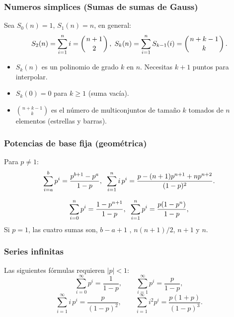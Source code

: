


\subsubsection{Numeros simplices (Sumas de sumas de Gauss)} Sea $S_0(n)=1$, $S_1(n) = n$, en general:
\[
S_2(n)
=\sum_{i=1}^n i= \binom{n+1}{2}
, \hspace{1mm}
S_k(n)
=\sum_{i=1}^n S_{k-1}(i) 
= \binom{n+k-1}{k}.
\]
\begin{extended}[]
\begin{itemize}
    \item $S_k(n)$ es un polinomio de grado $k$ en $n$. Necesitas $k+1$ puntos para interpolar.
    \item $S_k(0) = 0$ para $k\ge1$ (suma vacía).
    \item $\binom{n+k-1}{k}$ es el número de multiconjuntos de tamaño $k$ tomados de $n$ elementos (estrellas y barras).
\end{itemize}
\end{extended}





\subsubsection{Potencias de base fija (geométrica)}
Para $p\ne1$:
\[
\sum_{i=a}^b p^i=\frac{p^{b+1}-p^{a}}{1-p}, \hspace{2mm}
\sum_{i=1}^n i\,p^i
=\frac{p-(n+1)p^{n+1}+np^{n+2}}{(1-p)^2}.
\]
\begin{extended}[]
\[
\sum_{i=0}^n p^i=\frac{1-p^{n+1}}{1-p}, \hspace{2mm}
\sum_{i=1}^n p^i=\frac{p(1-p^n)}{1-p},
\]
Si $p=1$, las cuatro sumas son,
$b-a+1$ , $n(n+1)/2$, $n+1$ y $n$.
\end{extended}


\subsubsection{Series infinitas}
Las siguientes fórmulas requieren $|p|<1$:
\[
\sum_{i=0}^{\infty}p^i=\frac{1}{1-p},\qquad
\sum_{i=1}^{\infty}p^i=\frac{p}{1-p},
\]
\[
\sum_{i=1}^{\infty}i\,p^i=\frac{p}{(1-p)^2},\qquad
\sum_{i=1}^{\infty}i^2p^i=\frac{p(1+p)}{(1-p)^3}.
\]

